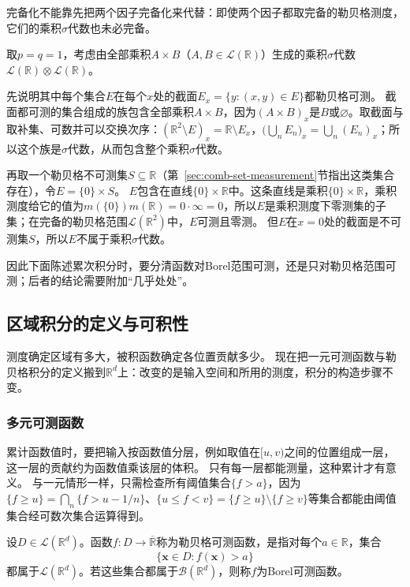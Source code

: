 完备化不能靠先把两个因子完备化来代替：即使两个因子都取完备的勒贝格测度，它们的乘积$\sigma$代数也未必完备。
\begin{example}
\label{ex:region-product-sigma-algebra-incomplete}
取$p=q=1$，考虑由全部乘积$A\times B$（$A,B\in\mathcal L(\mathbb R)$）生成的乘积$\sigma$代数$\mathcal L(\mathbb R)\otimes\mathcal L(\mathbb R)$。

先说明其中每个集合$E$在每个$x$处的截面$E_x=\{y:(x,y)\in E\}$都勒贝格可测。
截面都可测的集合组成的族包含全部乘积$A\times B$，因为$(A\times B)_x$是$B$或$\varnothing$。取截面与取补集、可数并可以交换次序：$(\mathbb R^2\setminus E)_x=\mathbb R\setminus E_x$，$\bigl(\bigcup_nE_n\bigr)_x=\bigcup_n(E_n)_x$；所以这个族是$\sigma$代数，从而包含整个乘积$\sigma$代数。

再取一个勒贝格不可测集$S\subseteq\mathbb R$（第~\ref{sec:comb-set-measurement}节指出这类集合存在），令$E=\{0\}\times S$。
$E$包含在直线$\{0\}\times\mathbb R$中。这条直线是乘积$\{0\}\times\mathbb R$，乘积测度给它的值为$m(\{0\})m(\mathbb R)=0\cdot\infty=0$，所以$E$是乘积测度下零测集的子集；在完备的勒贝格范围$\mathcal L(\mathbb R^2)$中，$E$可测且零测。
但$E$在$x=0$处的截面是不可测集$S$，所以$E$不属于乘积$\sigma$代数。
\end{example}

因此下面陈述累次积分时，要分清函数对Borel范围可测，还是只对勒贝格范围可测；后者的结论需要附加“几乎处处”。

\subsection{区域积分的定义与可积性}
\label{sec:multivariable-riemann-lebesgue}

测度确定区域有多大，被积函数确定各位置贡献多少。
现在把一元可测函数与勒贝格积分的定义搬到$\mathbb R^d$上：改变的是输入空间和所用的测度，积分的构造步骤不变。

\subsubsection{多元可测函数}

累计函数值时，要把输入按函数值分层，例如取值在$[u,v)$之间的位置组成一层，这一层的贡献约为函数值乘该层的体积。
只有每一层都能测量，这种累计才有意义。
与一元情形一样，只需检查所有阈值集合$\{f>a\}$，因为$\{f\geq u\}=\bigcap_n\{f>u-1/n\}$、$\{u\leq f<v\}=\{f\geq u\}\setminus\{f\geq v\}$等集合都能由阈值集合经可数次集合运算得到。
\begin{definition}[多元可测函数]
设$D\in\mathcal L(\mathbb R^d)$。函数$f:D\to\overline{\mathbb R}$称为勒贝格可测函数，是指对每个$a\in\mathbb R$，集合
\[
 \{\bm x\in D:f(\bm x)>a\}
\]
都属于$\mathcal L(\mathbb R^d)$。若这些集合都属于$\mathcal B(\mathbb R^d)$，则称$f$为Borel可测函数。
\end{definition}

